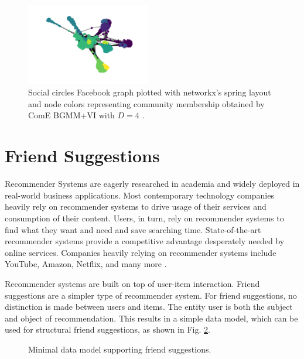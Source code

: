 \documentclass[conference]{IEEEtran}
\begin{document}
\begin{figure}[htbp]
    \centering
    \includegraphics[width=0.48\textwidth]{images/fb/graph_d4.png}
    \caption{Social circles Facebook graph plotted with networkx's spring layout and node colors representing community membership obtained by ComE BGMM+VI with $D=4$ \cite{networkx}.}
    \label{fig:fb_graph}
\end{figure}


\section{Friend Suggestions}

Recommender Systems are eagerly researched in academia and widely deployed in real-world business applications. Most contemporary technology companies heavily rely on recommender systems to drive usage of their services and consumption of their content. Users, in turn, rely on recommender systems to find what they want and need and save searching time. State-of-the-art recommender systems provide a competitive advantage desperately needed by online services. Companies heavily relying on recommender systems include YouTube, Amazon, Netflix, and many more \cite{Rocca19}.

Recommender systems are built on top of user-item interaction. Friend suggestions are a simpler type of recommender system. For friend suggestions, no distinction is made between users and items. The entity user is both the subject and object of recommendation. This results in a simple data model, which can be used for structural friend suggestions, as shown in Fig. \ref{fig:data_model}.

\begin{figure}[htbp]
    \centering
    \caption{Minimal data model supporting friend suggestions.}
    \label{fig:data_model}
\end{figure}
\end{document}
